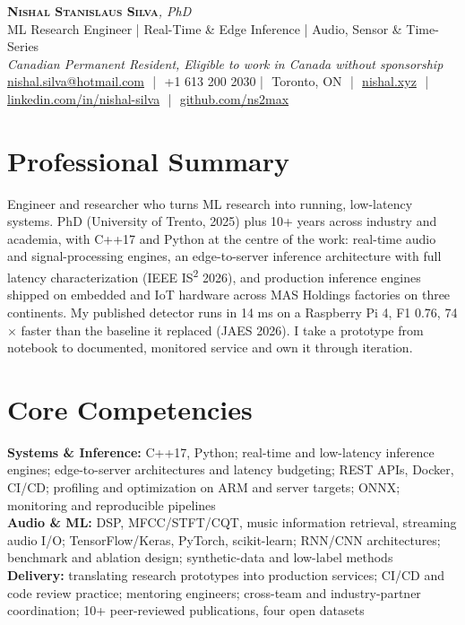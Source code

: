 \documentclass[11pt]{article}
\makeatletter
\newcommand{\cvName}{Nishal Stanislaus Silva}
\newcommand{\cvEmail}{nishal.silva@hotmail.com}
\newcommand{\cvPhone}{+1 613 200 2030}
\newcommand{\cvCity}{Toronto, ON}
\newcommand{\cvSite}{https://nishal.xyz}
\newcommand{\cvLinkedIn}{https://www.linkedin.com/in/nishal-silva}
\newcommand{\cvGitHub}{https://github.com/ns2max}
\newcommand{\cvStatus}{Canadian Permanent Resident, Eligible to work in Canada without sponsorship}
\newcommand{\cvTagline}{ML Research Engineer | Real-Time \& Edge Inference | Audio, Sensor \& Time-Series}
\makeatother
\begin{document}
\pagestyle{empty}
\begin{center}
    {\LARGE \scshape \textbf{\cvName}}{\large \textit{, PhD}}\\[1pt]
    {\small \cvTagline}\\[1pt]
    {\footnotesize\textit{\cvStatus}}\\[1pt]
    {\small
    \href{mailto:\cvEmail}{\cvEmail} \,\,|\,\, \cvPhone \,\,|\,\, \cvCity
    \,\,|\,\, \href{\cvSite}{nishal.xyz} \,\,|\,\, \href{\cvLinkedIn}{linkedin.com/in/nishal-silva}
    \,\,|\,\, \href{\cvGitHub}{github.com/ns2max}}
\end{center}

\section*{Professional Summary}

Engineer and researcher who turns ML research into running, low-latency systems. PhD (University of Trento, 2025) plus 10+ years across industry and academia, with C++17 and Python at the centre of the work: real-time audio and signal-processing engines, an edge-to-server inference architecture with full latency characterization (IEEE IS\textsuperscript{2} 2026), and production inference engines shipped on embedded and IoT hardware across MAS Holdings factories on three continents. My published detector runs in 14 ms on a Raspberry Pi 4, F1 0.76, 74$\times$ faster than the baseline it replaced (JAES 2026). I take a prototype from notebook to documented, monitored service and own it through iteration.

\section*{Core Competencies}

\textbf{Systems \& Inference:} C++17, Python; real-time and low-latency inference engines; edge-to-server architectures and latency budgeting; REST APIs, Docker, CI/CD; profiling and optimization on ARM and server targets; ONNX; monitoring and reproducible pipelines\\
\textbf{Audio \& ML:} DSP, MFCC/STFT/CQT, music information retrieval, streaming audio I/O; TensorFlow/Keras, PyTorch, scikit-learn; RNN/CNN architectures; benchmark and ablation design; synthetic-data and low-label methods\\
\textbf{Delivery:} translating research prototypes into production services; CI/CD and code review practice; mentoring engineers; cross-team and industry-partner coordination; 10+ peer-reviewed publications, four open datasets
\end{document}
